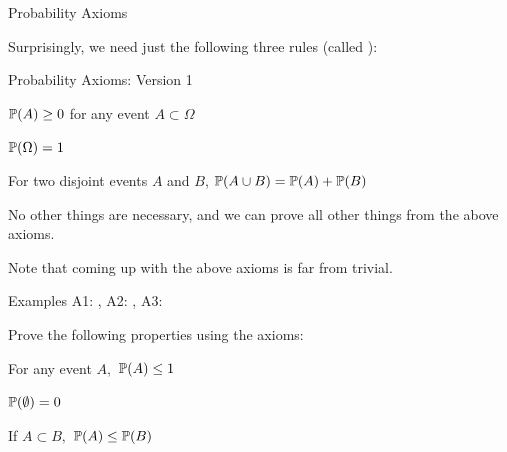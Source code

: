 \documentclass[fleqn,aspectratio=169]{beamer}
\begin{document}
\begin{frame}{Probability Axioms}

\plitemsep 0.1in

\bci 

\item<1-> Surprisingly, we need just the following three rules (called ):

\medskip

{
\begin{block}{Probability Axioms: Version 1}

\bce[{A}1.] 
\item {} $\mathbb{P}( A ) \geq 0$ for any event $A \subset \Omega$
\item {} $\mathbb{P}( \Omega ) = 1$
\item {} For two disjoint events $A$ and $B$, $\mathbb{P}( A \cup B ) = \mathbb{P}( A ) + \mathbb{P}( B )$
\ece
\end{block}
}

\item<3-> No other things are necessary, and we can prove all other 
things from the above axioms.

\item<4-> Note that coming up with the above axioms is far from trivial. 

\eci

\end{frame}

\begin{frame}{Examples}
A1: , A2: , A3: 

Prove the following properties using the axioms: \hfill {}

\plitemsep 0.1in


\bce 
\item For any event $A,$ $\mathbb{P}( A ) \leq 1$

\item $\mathbb{P}( \emptyset ) = 0$

\item If $A \subset B,$ $\mathbb{P}( A ) \leq \mathbb{P}( B )$
\ece

\end{frame}
\end{document}

